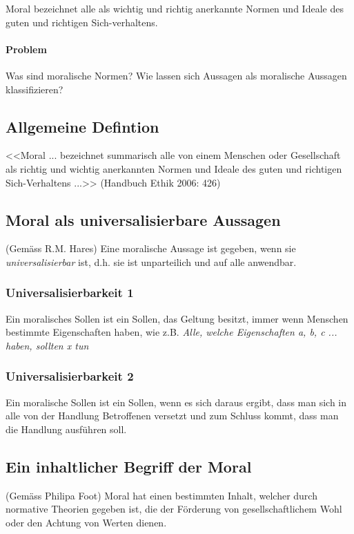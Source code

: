 \documentclass[../main.tex]{subfiles}
\begin{document}
\begin{warningbox}
Moral bezeichnet alle als wichtig und richtig anerkannte Normen und Ideale des guten und richtigen Sich-verhaltens. 
\end{warningbox}

\paragraph{Problem} Was sind moralische Normen? Wie lassen sich Aussagen als moralische Aussagen klassifizieren?

\subsection{Allgemeine Defintion}
<<Moral ... bezeichnet summarisch alle von einem Menschen oder Gesellschaft als richtig und wichtig anerkannten Normen und Ideale des guten und richtigen Sich-Verhaltens ...>> (Handbuch Ethik 2006: 426)

\subsection{Moral als universalisierbare Aussagen}
\begin{warningbox}	
(Gemäss R.M. Hares) Eine moralische Aussage ist gegeben, wenn sie \textit{universalisierbar} ist, d.h. sie ist unparteilich und auf alle anwendbar.
\end{warningbox}

\subsubsection{Universalisierbarkeit 1}
Ein moralisches Sollen ist ein Sollen, das Geltung besitzt, immer wenn Menschen bestimmte Eigenschaften haben, wie z.B. \textit{Alle, welche Eigenschaften a, b, c ... haben, sollten x tun}

\subsubsection{Universalisierbarkeit 2}
Ein moralische Sollen ist ein Sollen, wenn es sich daraus ergibt, dass man sich in alle von der Handlung Betroffenen versetzt und zum Schluss kommt, dass man die Handlung ausführen soll.

\subsection{Ein inhaltlicher Begriff der Moral}
\begin{warningbox}
(Gemäss Philipa Foot) Moral hat einen bestimmten Inhalt, welcher durch normative Theorien gegeben ist, die der Förderung von gesellschaftlichem Wohl oder den Achtung von Werten dienen. 
\end{warningbox}
\end{document}
